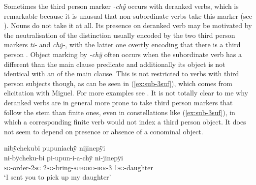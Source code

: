 Sometimes the third person marker \textit{-chÿ} occurs with deranked verbs, which is remarkable because it is unusual that non-subordinate verbs take this marker (see ). Nouns do not take it at all. Its presence on deranked verb may be motivated by the neutralisation of the distinction usually encoded by the two third person markers \textit{ti-} and \textit{chÿ-}, with the latter one overtly encoding that there is a third person . Object marking by \textit{-chÿ} often occurs when the subordinate verb has a different  than the main clause predicate and additionally its object is not identical with an  of the main clause. This is not restricted to verbs with third person subjects though, as can be seen in (\ref{ex:sub-3suf}), which comes from elicitation with Miguel. For more examples see . 
It is not totally clear to me why deranked  verbs are in general more prone to take third person markers that follow the stem than finite ones, even in constellations like (\ref{ex:sub-3suf}), in which a corresponding finite verb would not index a third person object. It does not seem to depend on presence or absence of a conominal object.

\ea\label{ex:sub-3suf}
\begingl
\glpreamble nibÿchekubi pupuniachÿ nijinepÿi\\
\gla ni-bÿcheku-bi pi-upun-i-a-chÿ ni-jinepÿi\\
\textsc{sg}-order-2\textsc{sg} 2\textsc{sg}-bring-\textsc{subord}-\textsc{irr}-3 1\textsc{sg}-daughter\\
\glft ‘I sent you to pick up my daughter’
\endgl
\trailingcitation{[mxx-e160811sd.301]}
\xe
{}

